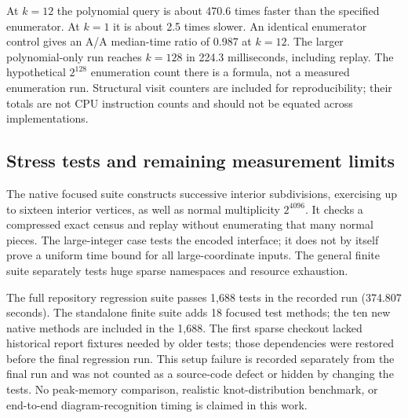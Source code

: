At $k=12$ the polynomial query is about 470.6 times faster than the
specified enumerator.  At $k=1$ it is about 2.5 times slower.  An identical
enumerator control gives an A/A median-time ratio of 0.987 at $k=12$.
The larger polynomial-only run reaches $k=128$ in 224.3 milliseconds,
including replay.  The hypothetical $2^{128}$ enumeration count there
is a formula, not a measured enumeration run.  Structural visit counters
are included for reproducibility; their totals are not CPU instruction
counts and should not be equated across implementations.

\subsection{Stress tests and remaining measurement limits}
The native focused suite constructs successive interior subdivisions,
exercising up to sixteen interior vertices, as well as normal multiplicity
$2^{4096}$.  It checks a compressed exact census and replay without
enumerating that many normal pieces.  The large-integer case tests the
encoded interface; it does not by itself prove a uniform time bound for
all large-coordinate inputs.  The general finite suite separately tests
huge sparse namespaces and resource exhaustion.

The full repository regression suite passes 1,688 tests in the recorded
run (374.807 seconds).  The standalone finite suite adds 18 focused test
methods; the ten new native methods are included in the 1,688.  The first
sparse checkout lacked historical report fixtures
needed by older tests; those dependencies were restored before the final
regression run.  This setup failure is recorded separately from the final
run and was not counted as a source-code defect or hidden by changing
the tests.  No peak-memory comparison, realistic knot-distribution benchmark,
or end-to-end diagram-recognition timing is claimed in this work.
